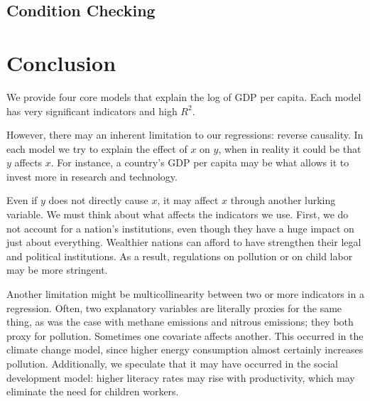 \documentclass[11pt]{article}
\begin{document}
\subsection{Condition Checking}



















\section{Conclusion}
\label{sec:conclusion}
We provide four core models that explain the log of GDP per capita. Each model has very significant indicators and high $R^2$.

However, there may an inherent limitation to our regressions: reverse causality.
In each model we try to explain the effect of $x$ on $y$, when in reality it could be that $y$ affects $x$. For instance, a country's GDP per capita may be what allows it to invest more in research and technology.

Even if $y$ does not directly cause $x$, it may affect $x$ through another lurking variable. We must think about what affects the indicators we use. First, we do not account for a nation's institutions, even though they have a huge impact on just about everything. Wealthier nations can afford to have strengthen their legal and political institutions. As a result, regulations on pollution or on child labor may be more stringent.

Another limitation might be multicollinearity between two or more indicators in a regression. Often, two explanatory variables are literally proxies for the same thing, as was the case with methane emissions and nitrous emissions; they both proxy for pollution. Sometimes one covariate affects another. This occurred in the climate change model, since higher energy consumption almost certainly increases pollution. Additionally, we speculate that it may have occurred in the social development model: higher literacy rates may rise with productivity, which may eliminate the need for children workers.
\end{document}

